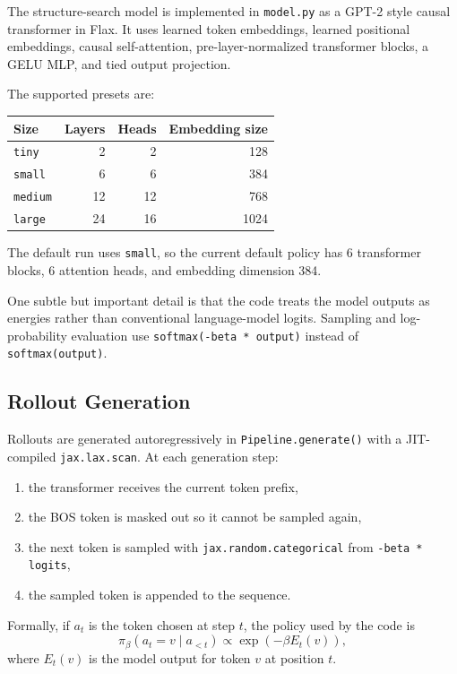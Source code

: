 \documentclass[11pt]{article}
\begin{document}
The structure-search model is implemented in \texttt{model.py} as a GPT-2 style causal transformer in Flax. It uses learned token embeddings, learned positional embeddings, causal self-attention, pre-layer-normalized transformer blocks, a GELU MLP, and tied output projection.

The supported presets are:

\begin{center}
\begin{tabular}{lrrr}
\toprule
Size & Layers & Heads & Embedding size \\
\midrule
\texttt{tiny} & 2 & 2 & 128 \\
\texttt{small} & 6 & 6 & 384 \\
\texttt{medium} & 12 & 12 & 768 \\
\texttt{large} & 24 & 16 & 1024 \\
\bottomrule
\end{tabular}
\end{center}

The default run uses \texttt{small}, so the current default policy has 6 transformer blocks, 6 attention heads, and embedding dimension 384.

One subtle but important detail is that the code treats the model outputs as energies rather than conventional language-model logits. Sampling and log-probability evaluation use \texttt{softmax(-beta * output)} instead of \texttt{softmax(output)}.

\subsection{Rollout Generation}

Rollouts are generated autoregressively in \texttt{Pipeline.generate()} with a JIT-compiled \texttt{jax.lax.scan}. At each generation step:

\begin{enumerate}[leftmargin=*]
\item the transformer receives the current token prefix,
\item the BOS token is masked out so it cannot be sampled again,
\item the next token is sampled with \texttt{jax.random.categorical} from \texttt{-beta * logits},
\item the sampled token is appended to the sequence.
\end{enumerate}

Formally, if $a_t$ is the token chosen at step $t$, the policy used by the code is
\[
\pi_\beta(a_t = v \mid a_{<t})
\propto
\exp\left(-\beta E_t(v)\right),
\]
where $E_t(v)$ is the model output for token $v$ at position $t$.
\end{document}
